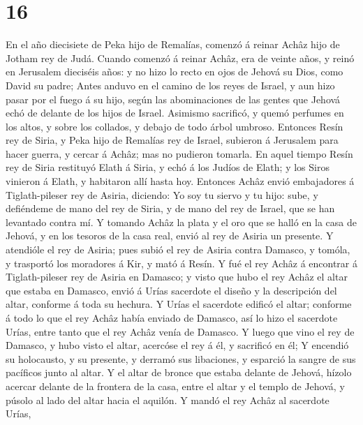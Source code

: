 \hypertarget{section-15}{%
\section{16}\label{section-15}}

 En el año diecisiete de Peka hijo de Remalías, comenzó á
reinar Achâz hijo de Jotham rey de Judá.  Cuando comenzó á
reinar Achâz, era de veinte años, y reinó en Jerusalem dieciséis años: y
no hizo lo recto en ojos de Jehová su Dios, como David su padre;
 Antes anduvo en el camino de los reyes de Israel, y aun
hizo pasar por el fuego á su hijo, según las abominaciones de las gentes
que Jehová echó de delante de los hijos de Israel.  Asimismo
sacrificó, y quemó perfumes en los altos, y sobre los collados, y debajo
de todo árbol umbroso.  Entonces Resín rey de Siria, y Peka
hijo de Remalías rey de Israel, subieron á Jerusalem para hacer guerra,
y cercar á Achâz; mas no pudieron tomarla.  En aquel tiempo
Resín rey de Siria restituyó Elath á Siria, y echó á los Judíos de
Elath; y los Siros vinieron á Elath, y habitaron allí hasta hoy.
 Entonces Achâz envió embajadores á Tiglath-pileser rey de
Asiria, diciendo: Yo soy tu siervo y tu hijo: sube, y defiéndeme de mano
del rey de Siria, y de mano del rey de Israel, que se han levantado
contra mí.  Y tomando Achâz la plata y el oro que se halló
en la casa de Jehová, y en los tesoros de la casa real, envió al rey de
Asiria un presente.  Y atendióle el rey de Asiria; pues
subió el rey de Asiria contra Damasco, y tomóla, y trasportó los
moradores á Kir, y mató á Resín.  Y fué el rey Achâz á
encontrar á Tiglath-pileser rey de Asiria en Damasco; y visto que hubo
el rey Achâz el altar que estaba en Damasco, envió á Urías sacerdote el
diseño y la descripción del altar, conforme á toda su hechura.
 Y Urías el sacerdote edificó el altar; conforme á todo lo
que el rey Achâz había enviado de Damasco, así lo hizo el sacerdote
Urías, entre tanto que el rey Achâz venía de Damasco.  Y
luego que vino el rey de Damasco, y hubo visto el altar, acercóse el rey
á él, y sacrificó en él;  Y encendió su holocausto, y su
presente, y derramó sus libaciones, y esparció la sangre de sus
pacíficos junto al altar.  Y el altar de bronce que estaba
delante de Jehová, hízolo acercar delante de la frontera de la casa,
entre el altar y el templo de Jehová, y púsolo al lado del altar hacia
el aquilón.  Y mandó el rey Achâz al sacerdote Urías,
